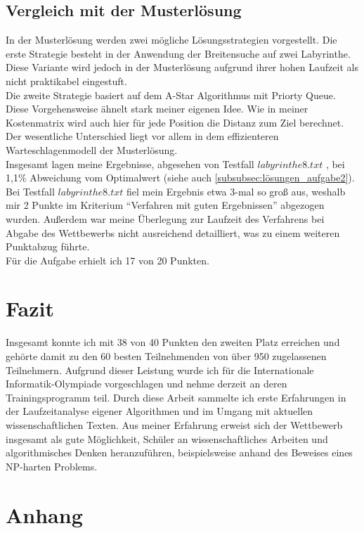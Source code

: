 \documentclass[a4paper,12pt,ngerman]{scrartcl}
\begin{document}
\subsection{Vergleich mit der Musterlösung}
In der Musterlösung werden zwei mögliche Lösungsstrategien vorgestellt.
Die erste Strategie besteht in der Anwendung der Breitensuche auf zwei Labyrinthe. 
Diese Variante wird jedoch in der Musterlösung aufgrund ihrer hohen Laufzeit als nicht praktikabel eingestuft.\\
Die zweite Strategie basiert auf dem A-Star Algorithmus mit Priorty Queue.\cite{bwinf_loesung}
Diese Vorgehensweise ähnelt stark meiner eigenen Idee. 
Wie in meiner Kostenmatrix wird auch hier für jede Position die Distanz zum Ziel berechnet.
Der wesentliche Unterschied liegt vor allem in dem effizienteren Warteschlagenmodell der Musterlösung.\cite{bwinf_loesung}\\
Insgesamt lagen meine Ergebnisse, abgesehen von Testfall $labyrinthe8.txt$ \cite{bwinf_website}, bei 1,1\% Abweichung vom Optimalwert\cite{bwinf_loesung} (siehe auch \ref{subsubsec:lösungen_aufgabe2}).
Bei Testfall $labyrinthe8.txt$ fiel mein Ergebnis etwa 3-mal so groß aus, weshalb mir 2 Punkte im Kriterium \enquote{Verfahren mit guten Ergebnissen} abgezogen wurden.
Außerdem war meine Überlegung zur Laufzeit des Verfahrens bei Abgabe des Wettbewerbs nicht ausreichend detailliert, was zu einem weiteren Punktabzug führte.\\
Für die Aufgabe erhielt ich 17 von 20 Punkten.

\section{Fazit}
Insgesamt konnte ich mit 38 von 40 Punkten den zweiten Platz erreichen und gehörte damit zu den 60 besten Teilnehmenden von über 950 zugelassenen Teilnehmern.
Aufgrund dieser Leistung wurde ich für die Internationale Informatik-Olympiade vorgeschlagen und nehme derzeit an deren Trainingsprogramm teil.
Durch diese Arbeit sammelte ich erste Erfahrungen in der Laufzeitanalyse eigener Algorithmen und im Umgang mit aktuellen wissenschaftlichen Texten.
Aus meiner Erfahrung erweist sich der Wettbewerb insgesamt als gute Möglichkeit, Schüler an wissenschaftliches Arbeiten und algorithmisches Denken heranzuführen, beispielsweise anhand des Beweises eines NP-harten Problems.

 \clearpage

\section{Anhang}
\end{document}
